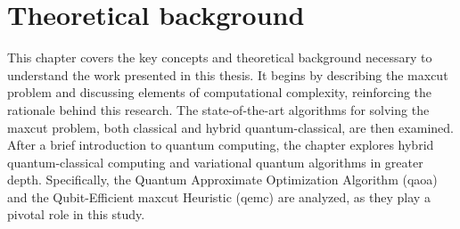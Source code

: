 \raggedbottom

\chapter{Theoretical background}
\label{chapter:Background}

This chapter covers the key concepts and theoretical background necessary to understand the work presented in this thesis. It begins by describing the \acrshort{maxcut} problem and discussing elements of computational complexity, reinforcing the rationale behind this research. The state-of-the-art algorithms for solving the \acrshort{maxcut} problem, both classical and hybrid quantum-classical, are then examined. After a brief introduction to quantum computing, the chapter explores hybrid quantum-classical computing and variational quantum algorithms in greater depth. Specifically, the Quantum Approximate Optimization Algorithm (\acrshort{qaoa}) and the Qubit-Efficient \acrshort{maxcut} Heuristic (\acrshort{qemc}) are analyzed, as they play a pivotal role in this study.





